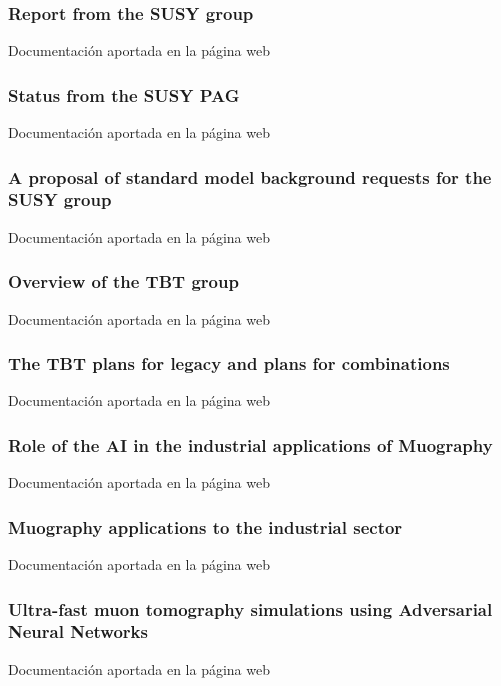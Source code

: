 \documentclass[a4paper, 11pt, twoside, openright]{report}
\begin{document}
\subsubsection{Report from the SUSY group}
%
Documentación aportada en la página web

\subsubsection{Status from the SUSY PAG}
%
Documentación aportada en la página web

\subsubsection{A proposal of standard model background requests for the SUSY group}
%
Documentación aportada en la página web

\subsubsection{Overview of the TBT group}
%
Documentación aportada en la página web

\subsubsection{The TBT plans for legacy and plans for combinations}
%
Documentación aportada en la página web

\subsubsection{Role of the AI in the industrial applications of Muography}
%
Documentación aportada en la página web

\subsubsection{Muography applications to the industrial sector}
%
Documentación aportada en la página web

\subsubsection{Ultra-fast muon tomography simulations using Adversarial Neural Networks}
%
Documentación aportada en la página web
\end{document}
